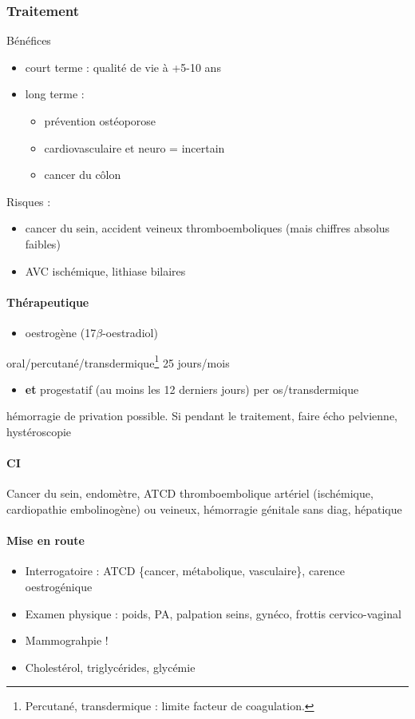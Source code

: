 \documentclass[11pt]{article}
\begin{document}
\subsubsection{Traitement}
\label{sec:orge074e94}
Bénéfices
\begin{itemize}
\item court terme : qualité de vie à +5-10 ans
\item long terme :
\begin{itemize}
\item prévention ostéoporose
\item cardiovasculaire et neuro = incertain
\item cancer du côlon
\end{itemize}
\end{itemize}
Risques :
\begin{itemize}
\item \inc cancer du sein, accident veineux thromboemboliques (mais chiffres absolus
faibles)
\item \inc AVC ischémique, lithiase bilaires
\end{itemize}

\paragraph{Thérapeutique}
\label{sec:org97ea9ac}
\begin{itemize}
\item oestrogène (17\(\beta\)-oestradiol)
\end{itemize}
oral/percutané/transdermique\footnote{Percutané, transdermique : limite \inc facteur de coagulation.} 25 jours/mois
\begin{itemize}
\item \textbf{et} progestatif (au moins les 12 derniers jours) per os/transdermique
\end{itemize}
\danger hémorragie de privation possible. Si pendant le traitement, faire écho
pelvienne, hystéroscopie

\paragraph{CI}
\label{sec:org4235fad}
Cancer du sein, endomètre, ATCD thromboembolique artériel (ischémique,
cardiopathie embolinogène) ou veineux, hémorragie génitale sans diag, hépatique

\paragraph{Mise en route}
\label{sec:orgcc5f789}
\begin{itemize}
\item Interrogatoire : ATCD \{cancer, métabolique, vasculaire\}, carence oestrogénique
\item Examen physique : poids, PA, palpation seins, gynéco, frottis cervico-vaginal
\item Mammograhpie !
\item Cholestérol, triglycérides, glycémie
\end{itemize}
\end{document}
